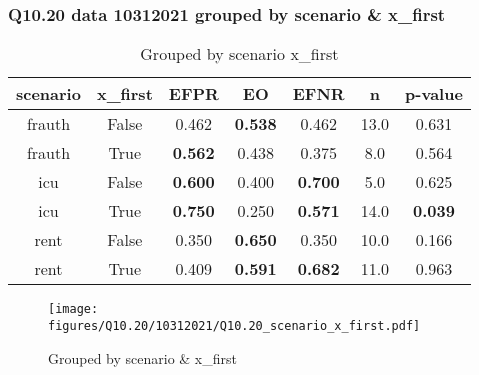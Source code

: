 \subsubsection{Q10.20 data 10312021 grouped by scenario \& x_first}

\begin{comment}
                     EFPR        EO      EFNR     n    pvalue
(frauth, False)  0.461538  0.538462  0.461538  13.0  0.630760
(frauth, True)   0.562500  0.437500  0.375000   8.0  0.563703
(icu, False)     0.600000  0.400000  0.700000   5.0  0.625000
(icu, True)      0.750000  0.250000  0.571429  14.0  0.039000
(rent, False)    0.350000  0.650000  0.350000  10.0  0.165518
(rent, True)     0.409091  0.590909  0.681818  11.0  0.962912
\end{comment}

\begin{table}[h]
    \centering
    \begin{tabular}{|c|c|c|c|c|c|c|}
        \hline
        scenario & x_first & EFPR & EO & EFNR & n & p-value\\
        \hline
        frauth & False & 0.462 & \textbf{0.538} & 0.462 & 13.0 & 0.631\\
		frauth & True & \textbf{0.562} & 0.438 & 0.375 & 8.0 & 0.564\\
		icu & False & \textbf{0.600} & 0.400 & \textbf{0.700} & 5.0 & 0.625\\
		icu & True & \textbf{0.750} & 0.250 & \textbf{0.571} & 14.0 & \textbf{0.039}\\
		rent & False & 0.350 & \textbf{0.650} & 0.350 & 10.0 & 0.166\\
		rent & True & 0.409 & \textbf{0.591} & \textbf{0.682} & 11.0 & 0.963\\
		
        \hline
    \end{tabular}
    \caption{Grouped by scenario x_first}
    \label{tab:my_label}
\end{table}
\begin{figure}[h]
    \centering
    \texttt{[image: figures/Q10.20/10312021/Q10.20\_scenario\_x\_first.pdf]}
    \caption{Grouped by scenario \& x_first}
    \label{fig:my_label}
\end{figure}
